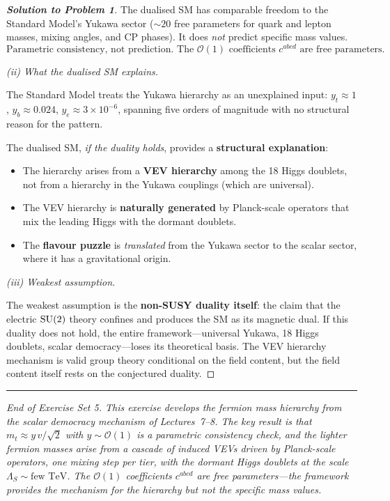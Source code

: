 \documentclass[11pt,a4paper]{article}
\begin{document}
\begin{proof}[\textbf{Solution to Problem 1}]
The dualised SM has comparable freedom to the Standard Model's Yukawa
sector ($\sim 20$ free parameters for quark and lepton masses, mixing
angles, and CP phases).  It does \emph{not} predict specific mass
values.
\[
  \boxed{\text{Parametric consistency, not prediction.  The }
  \mathcal{O}(1) \text{ coefficients } c^{abcd}
  \text{ are free parameters.}}
\]

\textit{(ii) What the dualised SM explains.}

The Standard Model treats the Yukawa hierarchy as an unexplained input:
$y_t \approx 1$, $y_b \approx 0.024$, $y_e \approx 3 \times 10^{-6}$,
spanning five orders of magnitude with no structural reason for the
pattern.

The dualised SM, \emph{if the duality holds}, provides a
\textbf{structural explanation}:
\begin{itemize}
  \item The hierarchy arises from a \textbf{VEV hierarchy} among the 18
    Higgs doublets, not from a hierarchy in the Yukawa couplings (which
    are universal).
  \item The VEV hierarchy is \textbf{naturally generated} by
    Planck-scale operators that mix the leading Higgs with the dormant
    doublets.
  \item The \textbf{flavour puzzle} is \emph{translated} from the
    Yukawa sector to the scalar sector, where it has a gravitational
    origin.
\end{itemize}

\textit{(iii) Weakest assumption.}

The weakest assumption is the \textbf{non-SUSY duality itself}: the
claim that the electric $\mathrm{SU}(2)$ theory confines and produces the SM
as its magnetic dual.  If this duality does not hold, the entire
framework---universal Yukawa, 18 Higgs doublets, scalar
democracy---loses its theoretical basis.  The VEV hierarchy mechanism
is valid group theory conditional on the field content, but the field
content itself rests on the conjectured duality.

\end{proof}


\bigskip

\begin{center}
\rule{0.6\textwidth}{0.4pt}

\textit{End of Exercise Set 5.  This exercise develops the fermion mass
hierarchy from the scalar democracy mechanism of Lectures~7--8.  The
key result is that $m_t \approx y\, v/\sqrt{2}$ with $y \sim \mathcal{O}(1)$ is a
parametric consistency check, and the lighter fermion masses arise from
a cascade of induced VEVs driven by Planck-scale operators, one mixing
step per tier, with the dormant Higgs doublets at the scale
$\Lambda_S \sim \text{few TeV}$.  The
$\mathcal{O}(1)$ coefficients $c^{abcd}$ are free parameters---the
framework provides the mechanism for the hierarchy but not the specific
mass values.}
\end{center}
\end{document}
